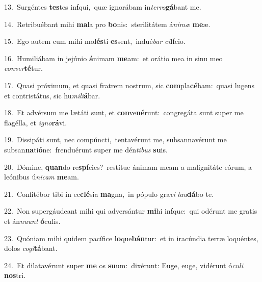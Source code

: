 {\numbfont\textcolor{\numbcolor}{13.}}~Surgéntes \textbf{tes}\-tes in\-\textbf{í}\-qui,~\star quæ ignorábam in\-\textit{ter}\-\textit{ro}\textbf{gá}bant me.\par
{\numbfont\textcolor{\numbcolor}{14.}}~Retribuébant mihi \textbf{ma}\-la pro \textbf{bo}\-nis:~\star sterilitátem á\-\textit{ni}\-\textit{mæ} \textbf{me}\-æ.\par
{\numbfont\textcolor{\numbcolor}{15.}}~Ego autem cum mihi mo\-\textbf{lés}\-ti \textbf{es}\-sent,~\star indué\textit{bar} \textit{ci}\-\textbf{lí}cio.\par
{\numbfont\textcolor{\numbcolor}{16.}}~Humiliábam in jejúnio \textbf{á}\-nimam \textbf{me}\-am:~\star et orátio mea in sinu meo \textit{con}\-\textit{ver}\textbf{té}tur.\par
{\numbfont\textcolor{\numbcolor}{17.}}~Quasi próximum, et quasi fratrem nostrum, sic \textbf{com}\-pla\-\textbf{cé}\-bam:~\star quasi lugens et contristátus, sic hu\-\textit{mi}\-\textit{li}\textbf{á}bar.\par
{\numbfont\textcolor{\numbcolor}{18.}}~Et advérsum me lætáti sunt, et \textbf{con}\-ve\-\textbf{né}\-runt:~\star congregáta sunt super me flagélla, et \textit{i}\-\textit{gno}\textbf{rá}vi.\par
{\numbfont\textcolor{\numbcolor}{19.}}~Dissipáti sunt, nec compúncti,~\dagger tentavérunt me, subsannavérunt me subsan\-\textbf{na}\-ti\-\textbf{ó}\-ne:~\star frenduérunt super me dén\-\textit{ti}\-\textit{bus} \textbf{su}\-is.\par
{\numbfont\textcolor{\numbcolor}{20.}}~Dómine, \textbf{quan}\-do re\-\textbf{spí}\-cies?~\star restítue ánimam meam a malignitáte eórum, a leónibus ú\-\textit{ni}\-\textit{cam} \textbf{me}\-am.\par
{\numbfont\textcolor{\numbcolor}{21.}}~Confitébor tibi in ec\-\textbf{clé}\-sia \textbf{ma}\-gna,~\star in pópulo gra\textit{vi} \textit{lau}\-\textbf{dá}bo te.\par
{\numbfont\textcolor{\numbcolor}{22.}}~Non supergáudeant mihi qui adversántur \textbf{mi}\-hi in\-\textbf{í}\-que:~\star qui odérunt me gratis et án\-\textit{nu}\-\textit{unt} \textbf{ó}\-culis.\par
{\numbfont\textcolor{\numbcolor}{23.}}~Quóniam mihi quidem pacífice \textbf{lo}\-que\-\textbf{bán}\-tur:~\star et in iracúndia terræ loquéntes, dolos \textit{co}\-\textit{gi}\textbf{tá}bant.\par
{\numbfont\textcolor{\numbcolor}{24.}}~Et dilatavérunt super \textbf{me} os \textbf{su}\-um:~\star dixérunt: Euge, euge, vidérunt ó\-\textit{cu}\-\textit{li} \textbf{nos}\-tri.\par
